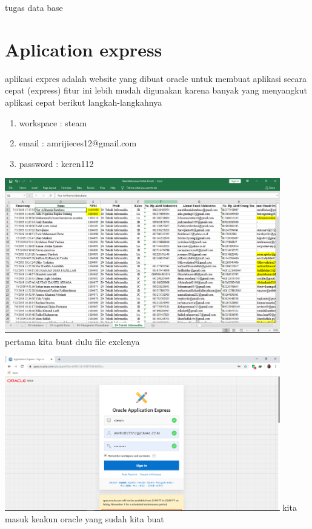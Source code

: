 \documentclass[12pt, times news roman, a4paper] {article}
\begin{document}
\begin{center}
	\LARGE{tugas data base}\\
	
\end{center}
\section{Aplication express}
aplikasi expres adalah website yang dibuat oracle untuk membuat aplikasi secara cepat (express) fitur ini lebih mudah digunakan karena banyak yang menyangkut aplikasi cepat berikut langkah-langkahnya

\begin{enumerate}
	\item workspace : steam
	\item email     : amrijieces12@gmail.com
	\item password  : keren112
	
\end{enumerate}

\begin{minipage}{\linewidth}
	\centering
	\includegraphics[width=12cm]{Gambar.png} 
	 {pertama kita buat dulu file exclenya }
\end{minipage}

\begin{minipage}{\linewidth}
	\centering
	\includegraphics[width=12cm]{Gambar2.png} 
	 {kita masuk keakun oracle yang sudah kita buat }
\end{minipage}
\end{document}
